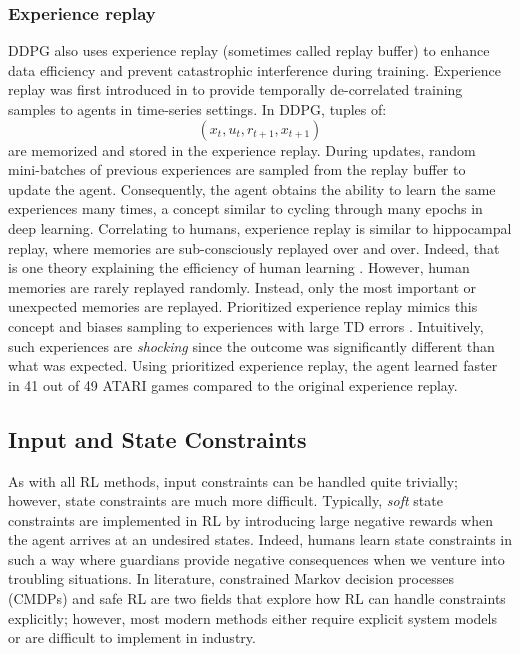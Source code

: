 \subsubsection{Experience replay}
DDPG also uses experience replay (sometimes called replay buffer) to enhance data efficiency and prevent catastrophic interference during training.  Experience replay was first introduced in \cite{exp_replay} to provide temporally de-correlated training samples to agents in time-series settings. In DDPG, tuples of:
$$(x_t, u_t, r_{t+1}, x_{t+1})$$
are memorized and stored in the experience replay. During updates, random mini-batches of previous experiences are sampled from the replay buffer to update the agent. Consequently, the agent obtains the ability to learn the same experiences many times, a concept similar to cycling through many epochs in deep learning. Correlating to humans, experience replay is similar to hippocampal replay, where memories are sub-consciously replayed over and over.  Indeed, that is one theory explaining the efficiency of human learning \cite{hippocampal}. However, human memories are rarely replayed randomly. Instead, only the most important or unexpected memories are replayed. Prioritized experience replay mimics this concept and biases sampling to experiences with large TD errors \cite{p_exp}. Intuitively, such experiences are \textit{shocking} since the outcome was significantly different than what was expected. Using prioritized experience replay, the agent learned faster in 41 out of 49 ATARI games compared to the original experience replay.

\subsection{Input and State Constraints}
As with all RL methods, input constraints can be handled quite trivially; however, state constraints are much more difficult. Typically, \textit{soft} state constraints are implemented in RL by introducing large negative rewards when the agent arrives at an undesired states. Indeed, humans learn state constraints in such a way where guardians provide negative consequences when we venture into troubling situations.  In literature, constrained Markov decision processes (CMDPs) and safe RL are two fields that explore how RL can handle constraints explicitly; however, most modern methods either require explicit system models or are difficult to implement in industry. 



